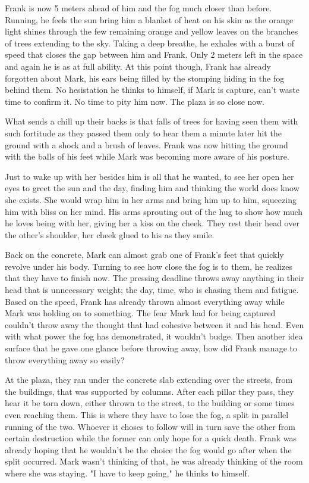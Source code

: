 \begin{Document}
        Frank is now 5 meters ahead of him and the fog much closer than before. Running, he feels the sun bring him a blanket of heat on his skin as the
    orange light shines through the few remaining orange and yellow leaves on the branches of trees extending to the sky. Taking a deep breathe, he
    exhales with a burst of speed that closes the gap between him and Frank. Only 2 meters left in the space and again he is as at full ability. At this
    point though, Frank has already forgotten about Mark, his ears being filled by the stomping hiding in the fog behind them. No hesistation he thinks to
    himself, if Mark is capture, can't waste time to confirm it. No time to pity him now. The plaza is so close now.

       What sends a chill up their backs is that falls of trees for having seen them with such fortitude as they passed them only to hear them a minute later
    hit the ground with a shock and a brush of leaves. Frank was now hitting the ground with the balls of his feet while Mark was becoming more aware of his
    posture.

        Just to wake up with her besides him is all that he wanted, to see her open her eyes to greet the sun and the day, finding him and thinking the world
    does know she exists. She would wrap him in her arms and bring him up to him, squeezing him with bliss on her mind. His arms sprouting out of the hug to
    show how much he loves being with her, giving her a kiss on the cheek. They rest their head over the other's shoulder, her cheek glued to his as they
    smile.

        Back on the concrete, Mark can almost grab one of Frank's feet that quickly revolve under his body. Turning to see how close the fog is to them, he
    realizes that they have to finish now. The pressing deadline throws away anything in their head that is unnecessary weight; the day, time, who is chasing
    them and fatigue. Based on the speed, Frank has already thrown almost everything away while Mark was holding on to something. The fear Mark had for being
    captured couldn't throw away the thought that had cohesive between it and his head. Even with what power the fog has demonstrated, it wouldn't budge. Then
    another idea surface that he gave one glance before throwing away, how did Frank manage to throw everything away so easily?

        At the plaza, they ran under the concrete slab extending over the streets, from the buildings, that was supported by columns. After each pillar they pass,
    they hear it be torn down, either thrown to the street, to the building or some times even reaching them. This is where they have to lose the fog, a split in
    parallel running of the two. Whoever it choses to follow will in turn save the other from certain destruction while the former can only hope for a quick death.
    Frank was already hoping that he wouldn't be the choice the fog would go after when the split occurred. Mark wasn't thinking of that, he was already thinking
    of the room where she was staying. "I have to keep going," he thinks to himself.
\end{Document}
